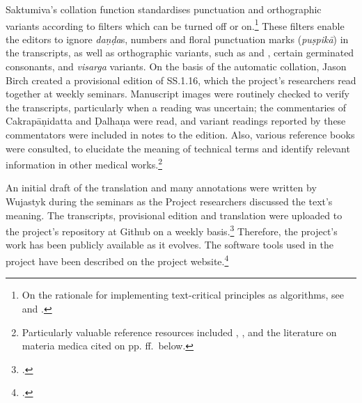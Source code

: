 Saktumiva's  collation function standardises punctuation and orthographic
variants according to filters which can be turned off or on.\footnote{On the
    rationale for implementing text-critical principles as algorithms, see
    \cite{li-2017} and \cite[\S 4.4]{li-2018}.} These filters enable the editors to ignore
    \emph{daṇḍa}s, numbers and floral punctuation marks (\emph{puṣpikā}) in the
    transcripts, as well as orthographic variants, such as  and ,
    certain germinated consonants, and \emph{visarga} variants. On the basis of
    the automatic collation, Jason Birch created a provisional edition of SS.1.16,
    which the project's researchers read together at weekly seminars. Manuscript
    images were routinely checked to verify the transcripts, particularly when a
    reading was uncertain; the commentaries of Cakrapāṇidatta and Ḍalhaṇa were
    read, and variant readings reported by these commentators were included in
    notes to the edition. Also, various reference books were consulted, to
    elucidate the meaning of technical terms and identify relevant information in
    other medical works.\footnote{Particularly valuable reference resources
        included \citet{josi-maha,nadk-1954}, \citet{meul-hist}, and the literature on
        materia medica cited on pp.\,\pageref{botanicalsourcebooks}\,ff.\ below.}

An initial draft of the translation and many annotations were written by
Wujastyk during the seminars as the Project researchers discussed the text's
meaning. The transcripts, provisional edition and translation were uploaded to
the project's repository at Github on a weekly basis.\footcite{wuja-2021c}
Therefore, the project's work has been publicly available as it evolves. The
software tools used in the project have been described on the project
website.\footcite[“The toolbox”]{wuja-2021b}

